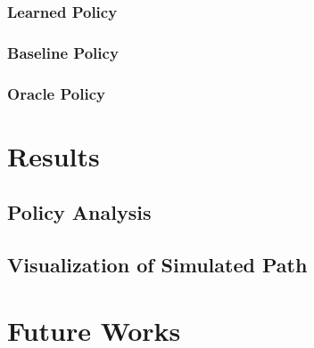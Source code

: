 \documentclass[letterpaper, 10 pt, conference]{ieeeconf}
\begin{document}
\subsubsection{Learned Policy}

\subsubsection{Baseline Policy}

\subsubsection{Oracle Policy}

\section{Results}
\subsection{Policy Analysis}

\subsection{Visualization of Simulated Path}

\section{Future Works}

% 
\end{document}
